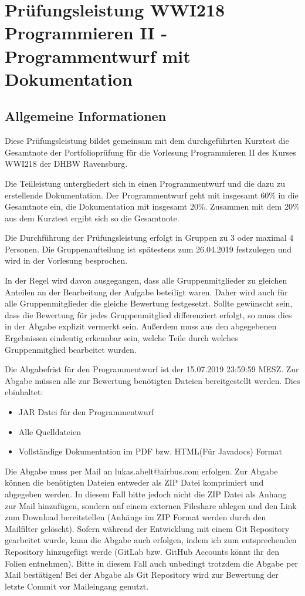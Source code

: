 \documentclass[a4paper,
			   fontsize=12pt]{article}
\begin{document}
\section*{Prüfungsleistung WWI218 Programmieren II - Programmentwurf mit Dokumentation}

\vspace{0,75cm}

\subsection*{Allgemeine Informationen}
Diese Prüfungsleistung bildet gemeinsam mit dem durchgeführten Kurztest die Gesamtnote der Portfolioprüfung für die Vorlesung Programmieren II des Kurses WWI218 der DHBW Ravensburg.

Die Teilleistung untergliedert sich in einen Programmentwurf und die dazu zu erstellende Dokumentation. Der Programmentwurf geht mit insgesamt 60\% in die Gesamtnote ein, die Dokumentation mit insgesamt 20\%. Zusammen mit dem 20\% aus dem Kurztest ergibt sich so die Gesamtnote.

Die Durchführung der Prüfungsleistung erfolgt in Gruppen zu 3 oder maximal 4 Personen. Die Gruppenaufteilung ist spätestens zum 26.04.2019 festzulegen und wird in der Vorlesung besprochen. 

In der Regel wird davon ausgegangen, dass alle Gruppenmitglieder zu gleichen Anteilen an der Bearbeitung der Aufgabe beteiligt waren. Daher wird auch für alle Gruppenmitglieder die gleiche Bewertung festgesetzt. Sollte gewünscht sein, dass die Bewertung für jedes
Gruppenmitglied differenziert erfolgt, so muss dies in der Abgabe explizit vermerkt sein. Außerdem muss aus den abgegebenen Ergebnissen eindeutig erkennbar sein, welche Teile durch
welches Gruppenmitglied bearbeitet wurden.

Die Abgabefrist für den Programmentwurf ist der 15.07.2019 23:59:59 MESZ. Zur Abgabe müssen alle zur Bewertung benötigten Dateien bereitgestellt werden. Dies ebinhaltet:

\begin{itemize}
	\item JAR Datei für den Programmentwurf
	\item Alle Quelldateien
	\item Vollständige Dokumentation im PDF bzw. HTML(Für Javadocs) Format
\end{itemize}

Die Abgabe muss per Mail an lukas.abelt@airbus.com erfolgen. Zur Abgabe können die benötigten Dateien entweder als ZIP Datei komprimiert und abgegeben werden. In diesem Fall bitte jedoch nicht die ZIP Datei als Anhang zur Mail hinzufügen,
sondern auf einem externen Fileshare ablegen und den Link zum Download bereitstellen (Anhänge im ZIP Format werden durch den Mailfilter gelöscht). Sofern während der Entwicklung mit einem Git Repository gearbeitet wurde,
kann die Abgabe auch erfolgen, indem ich zum entsprechenden Repository hinzugefügt werde (GitLab bzw. GitHub Accounts könnt ihr den Folien entnehmen). Bitte in diesem Fall auch unbedingt trotzdem die Abgabe per Mail bestätigen! Bei der Abgabe als
Git Repository wird zur Bewertung der letzte Commit vor Maileingang genutzt.
\end{document}
